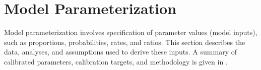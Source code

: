 \section{Model Parameterization}\label{mod.par}
Model parameterization involves specification of parameter values (model inputs),
such as proportions, probabilities, rates, and ratios.
This section describes the data, analyses, and assumptions used to derive these inputs.
A summary of calibrated parameters, calibration targets, and methodology is given in .












